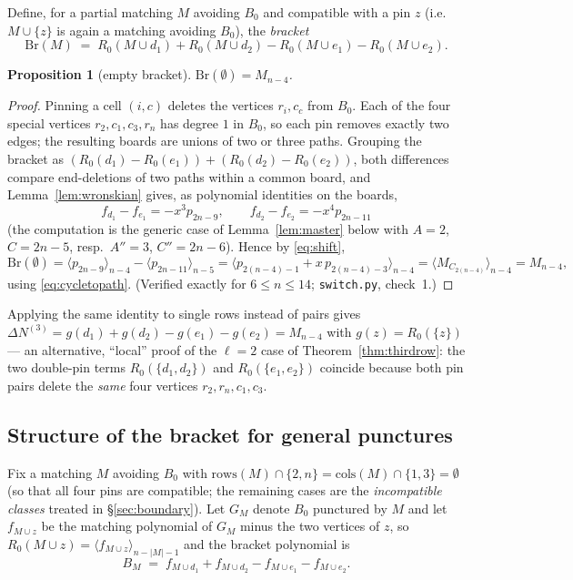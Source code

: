 \documentclass[11pt]{article}
\newtheorem{proposition}[theorem]{Proposition}
\theoremstyle{definition}
\begin{document}
Define, for a partial matching $M$ avoiding $B_0$ and compatible with a
pin $z$ (i.e.\ $M\cup\{z\}$ is again a matching avoiding $B_0$), the
\emph{bracket}
\[
\mathrm{Br}(M)\;=\;R_0(M\cup d_1)+R_0(M\cup d_2)-R_0(M\cup e_1)-R_0(M\cup e_2).
\]

\begin{proposition}[empty bracket]\label{prop:S0}
$\mathrm{Br}(\emptyset)=M_{n-4}$.
\end{proposition}

\begin{proof}
Pinning a cell $(i,c)$ deletes the vertices $r_i,c_c$ from $B_0$.  Each
of the four special vertices $r_2,c_1,c_3,r_n$ has degree $1$ in $B_0$,
so each pin removes exactly two edges; the resulting boards are unions of
two or three paths.  Grouping the bracket as
$(R_0(d_1)-R_0(e_1))+(R_0(d_2)-R_0(e_2))$, both differences compare
end-deletions of two paths within a common board, and
Lemma~\ref{lem:wronskian} gives, as polynomial identities on the boards,
\[
f_{d_1}-f_{e_1}=-x^3p_{2n-9},\qquad
f_{d_2}-f_{e_2}=-x^4p_{2n-11}
\]
(the computation is the generic case of Lemma~\ref{lem:master} below with
$A=2$, $C=2n-5$, resp.\ $A''=3$, $C''=2n-6$).  Hence by \eqref{eq:shift},
\[
\mathrm{Br}(\emptyset)
=\langle p_{2n-9}\rangle_{n-4}-\langle p_{2n-11}\rangle_{n-5}
=\bigl\langle p_{2(n-4)-1}+x\,p_{2(n-4)-3}\bigr\rangle_{n-4}
=\langle M_{C_{2(n-4)}}\rangle_{n-4}=M_{n-4},
\]
using \eqref{eq:cycletopath}.  (Verified exactly for $6\le n\le14$;
\texttt{switch.py}, check~1.)
\end{proof}

Applying the same identity to single rows instead of pairs gives
$\Delta N^{(3)}=g(d_1)+g(d_2)-g(e_1)-g(e_2)=M_{n-4}$ with
$g(z)=R_0(\{z\})$ --- an alternative, ``local'' proof of the $\ell=2$
case of Theorem~\ref{thm:thirdrow}: the two double-pin terms
$R_0(\{d_1,d_2\})$ and $R_0(\{e_1,e_2\})$ coincide because both pin pairs
delete the \emph{same} four vertices $r_2,r_n,c_1,c_3$.

\subsection{Structure of the bracket for general punctures}

Fix a matching $M$ avoiding $B_0$ with $\mathrm{rows}(M)\cap\{2,n\}=
\mathrm{cols}(M)\cap\{1,3\}=\emptyset$ (so that all four pins are
compatible; the remaining cases are the \emph{incompatible classes}
treated in \S\ref{sec:boundary}).  Let $G_M$ denote $B_0$ punctured by
$M$ and let $f_{M\cup z}$ be the matching polynomial of $G_M$ minus the
two vertices of $z$, so $R_0(M\cup z)=\langle f_{M\cup z}\rangle_{n-|M|-1}$
and the bracket polynomial is
\[
B_M\;=\;f_{M\cup d_1}+f_{M\cup d_2}-f_{M\cup e_1}-f_{M\cup e_2}.
\]
\end{document}
